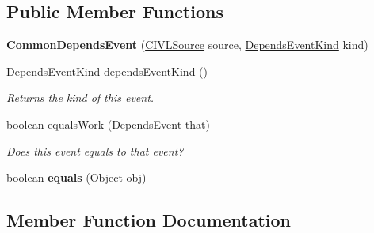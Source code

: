 \subsection*{Public Member Functions}
\begin{DoxyCompactItemize}
\item 
\hypertarget{classedu_1_1udel_1_1cis_1_1vsl_1_1civl_1_1model_1_1common_1_1contract_1_1CommonDependsEvent_ae075188a76f16ab1d72667ffaa999a43}{}{\bfseries Common\+Depends\+Event} (\hyperlink{interfaceedu_1_1udel_1_1cis_1_1vsl_1_1civl_1_1model_1_1IF_1_1CIVLSource}{C\+I\+V\+L\+Source} source, \hyperlink{enumedu_1_1udel_1_1cis_1_1vsl_1_1civl_1_1model_1_1IF_1_1contract_1_1DependsEvent_1_1DependsEventKind}{Depends\+Event\+Kind} kind)\label{classedu_1_1udel_1_1cis_1_1vsl_1_1civl_1_1model_1_1common_1_1contract_1_1CommonDependsEvent_ae075188a76f16ab1d72667ffaa999a43}

\item 
\hyperlink{enumedu_1_1udel_1_1cis_1_1vsl_1_1civl_1_1model_1_1IF_1_1contract_1_1DependsEvent_1_1DependsEventKind}{Depends\+Event\+Kind} \hyperlink{classedu_1_1udel_1_1cis_1_1vsl_1_1civl_1_1model_1_1common_1_1contract_1_1CommonDependsEvent_abf20e5000c03514e26b828d1fa3189ca}{depends\+Event\+Kind} ()
\begin{DoxyCompactList}\small\item\em Returns the kind of this event. \end{DoxyCompactList}\item 
boolean \hyperlink{classedu_1_1udel_1_1cis_1_1vsl_1_1civl_1_1model_1_1common_1_1contract_1_1CommonDependsEvent_a1cd6928e50ae3a3d1b08c5bf4e491471}{equals\+Work} (\hyperlink{interfaceedu_1_1udel_1_1cis_1_1vsl_1_1civl_1_1model_1_1IF_1_1contract_1_1DependsEvent}{Depends\+Event} that)
\begin{DoxyCompactList}\small\item\em Does this event equals to that event? \end{DoxyCompactList}\item 
\hypertarget{classedu_1_1udel_1_1cis_1_1vsl_1_1civl_1_1model_1_1common_1_1contract_1_1CommonDependsEvent_af25285d1816b42944637e3100238976e}{}boolean {\bfseries equals} (Object obj)\label{classedu_1_1udel_1_1cis_1_1vsl_1_1civl_1_1model_1_1common_1_1contract_1_1CommonDependsEvent_af25285d1816b42944637e3100238976e}

\end{DoxyCompactItemize}


\subsection{Member Function Documentation}
\hypertarget{classedu_1_1udel_1_1cis_1_1vsl_1_1civl_1_1model_1_1common_1_1contract_1_1CommonDependsEvent_abf20e5000c03514e26b828d1fa3189ca}{}

